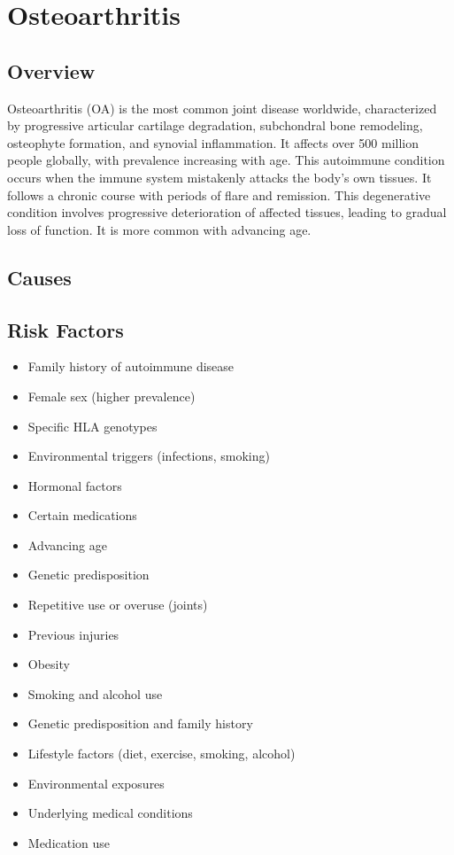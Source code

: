 \chapter{Osteoarthritis}
\label{sec:Osteoarthritis}

\section{Overview}
Osteoarthritis (OA) is the most common joint disease worldwide, characterized by progressive articular cartilage degradation, subchondral bone remodeling, osteophyte formation, and synovial inflammation. It affects over 500 million people globally, with prevalence increasing with age. This autoimmune condition occurs when the immune system mistakenly attacks the body's own tissues. It follows a chronic course with periods of flare and remission. This degenerative condition involves progressive deterioration of affected tissues, leading to gradual loss of function. It is more common with advancing age.
\section{Causes}
\section{Risk Factors}

\begin{itemize}[noitemsep]
  \item Family history of autoimmune disease
  \item Female sex (higher prevalence)
  \item Specific HLA genotypes
  \item Environmental triggers (infections, smoking)
  \item Hormonal factors
  \item Certain medications
  \item Advancing age
  \item Genetic predisposition
  \item Repetitive use or overuse (joints)
  \item Previous injuries
  \item Obesity
  \item Smoking and alcohol use
  \item Genetic predisposition and family history
  \item Lifestyle factors (diet, exercise, smoking, alcohol)
  \item Environmental exposures
  \item Underlying medical conditions
  \item Medication use
\end{itemize}
